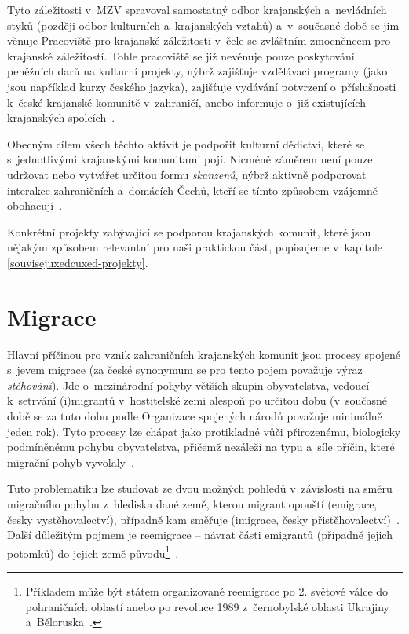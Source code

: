 Tyto záležitosti v~MZV spravoval samostatný odbor krajanských a~nevládních styků (později odbor kulturních a~krajanských vztahů) a~v~současné době se jim věnuje Pracoviště pro krajanské záležitosti v~čele se zvláštním zmocněncem pro krajanské záležitostí. Tohle pracoviště se již nevěnuje pouze poskytování peněžních darů na kulturní projekty, nýbrž zajišťuje vzdělávací programy (jako jsou například kurzy českého jazyka), zajišťuje vydávání potvrzení o~příslušnosti k~české krajanské komunitě v~zahraničí, anebo informuje o~již existujících krajanských spolcích~\parencite{Krajane-mv3}.

Obecným cílem všech těchto aktivit je podpořit kulturní dědictví, které se s~jednotlivými krajanskými komunitami pojí. Nicméně záměrem není pouze udržovat nebo vytvářet určitou formu \emph{skanzenů}, nýbrž aktivně podporovat interakce zahraničních a~domácích Čechů, kteří se tímto způsobem vzájemně obohacují~\parencite{Broucek2009}.

Konkrétní projekty zabývající se podporou krajanských komunit, které jsou nějakým způsobem relevantní pro naši praktickou část, popisujeme v~kapitole \ref{souvisejuxedcuxed-projekty}.

\hypertarget{migrace}{%
\section{Migrace}\label{migrace}}

Hlavní příčinou pro vznik zahraničních krajanských komunit jsou procesy spojené s~jevem migrace (za české synonymum se pro tento pojem považuje výraz \emph{stěhování}). Jde o~mezinárodní pohyby větších skupin obyvatelstva, vedoucí k~setrvání (i)migrantů v~hostitelské zemi alespoň po určitou dobu (v~současné době se za tuto dobu podle Organizace spojených národů považuje minimálně jeden rok). Tyto procesy lze chápat jako protikladné vůči přirozenému, biologicky podmíněnému pohybu obyvatelstva, přičemž nezáleží na typu a~síle příčin, které migrační pohyb vyvolaly~\parencite{Nespor2005}.

Tuto problematiku lze studovat ze dvou možných pohledů v~závislosti na směru migračního pohybu z~hlediska dané země, kterou migrant opouští (emigrace, česky vystěhovalectví), případně kam směřuje (imigrace, česky přistěhovalectví)~\parencite{Fialova2017b}. Další důležitým pojmem je reemigrace -- návrat části emigrantů (případně jejich potomků) do jejich země původu\footnote{Příkladem může být státem organizované reemigrace po 2. světové válce do pohraničních oblastí anebo po revoluce 1989 z~černobylské oblasti Ukrajiny a~Běloruska~\parencite{Vaculik2002}.}~\parencite{Nespor2005}.

